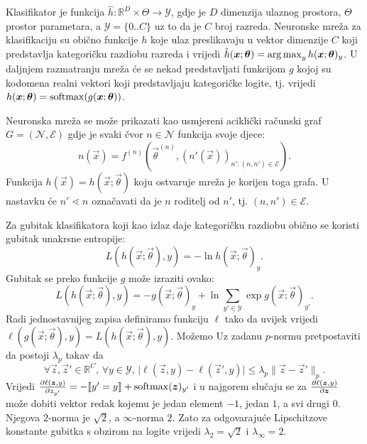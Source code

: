\documentclass[utf8, seminar, numeric, lmodern]{feri}
\begin{document}
Klasifikator je funkcija $\hat{h}:\mathbb{R}^D\times{\varTheta} \to \mathcal{Y}$, gdje je $D$ dimenzija ulaznog prostora, $\Theta$ prostor parametara, a $\mathcal{Y}=\{0..C\}$ uz to da je $C$ broj razreda. Neuronske mreža za klasifikaciju su obično funkcije $h$ koje ulaz preslikavaju u vektor dimenzije $C$ koji predstavlja kategoričku razdiobu razreda i vrijedi $\hat{h}(\bm{x};\bm{\theta}) = \operatorname*{arg\,max}_y h(\bm{x};\bm{\theta})_y$. U daljnjem razmatranju mreža će se nekad predstavljati funkcijom $g$ kojoj su kodomena realni vektori koji predstavljaju kategoričke logite, tj. vrijedi $h(\bm{x};\bm{\theta}) = \operatorname{softmax}(g(\bm{x};\bm{\theta}))$.

Neuronska mreža se može prikazati kao usmjereni aciklički računski graf $G = (\mathcal{N}, \mathcal{E})$ gdje je svaki čvor $n\in\mathcal{N}$ funkcija svoje djece:
\begin{equation}
n(\vec x)=f^{(n)}(\vec\theta^{(n)}, (n'(\vec x))_{n':(n,n')\in\mathcal{E}}).
\end{equation}
Funkcija $h(\vec x) = h(\vec x;\vec\theta)$ koju ostvaruje mreža je korijen toga grafa. U nastavku će $n'\lessdot n$ označavati da je $n$ roditelj od $n'$, tj. $(n,n')\in\mathcal{E}$.

Za gubitak klasifikatora koji kao izlaz daje kategoričku razdiobu obično se koristi gubitak unakrsne entropije:
\begin{equation}
L(h(\vec x;\vec\theta), y) = -\ln h(\vec x;\vec\theta)_y .
\end{equation}
Gubitak se preko funkcije $g$ može izraziti ovako:
\begin{equation}
L(h(\vec x;\vec\theta), y) = -g(\vec x;\vec\theta)_y + \ln \sum_{y'\in\mathcal{Y}}\exp g(\vec x;\vec\theta)_{y'}.
\end{equation}
Radi jednostavnijeg zapisa definiramo funkciju $\ell$ tako da uvijek vrijedi $\ell(g(\vec x;\vec\theta),y) = L(h(\vec x;\vec\theta),y)$. Možemo Uz zadanu $p$-normu pretpostaviti da postoji $\lambda_p$ takav da
\begin{equation}\label{eq:loss-lipschitz}
\forall \vec z, \vec z'\in \mathbb{R}^C,\, \forall y\in\mathcal{Y},\,
\lvert \ell(\vec z,y)-\ell(\vec z',y)\rvert 
\leq \lambda_p \lVert \vec z-\vec z'\rVert_p.
\end{equation}
Vrijedi $\frac{\partial \ell(\bm{z},y)}{\partial z_{y'}} = -\llbracket y'=y \rrbracket + \operatorname{softmax}(\bm{z})_{y'}$ i u najgorem slučaju se za $\frac{\partial \ell(\bm{z},y)}{\partial \bm{z}}$ može dobiti vektor redak kojemu je jedan element $-1$, jedan $1$, a svi drugi $0$. Njegova $2$-norma je $\sqrt 2$, a $\infty$-norma $2$. Zato za odgovarajuće Lipschitzove konstante gubitka s obzirom na logite vrijedi $\lambda_2=\sqrt 2$ i $\lambda_\infty=2$.
\end{document}
